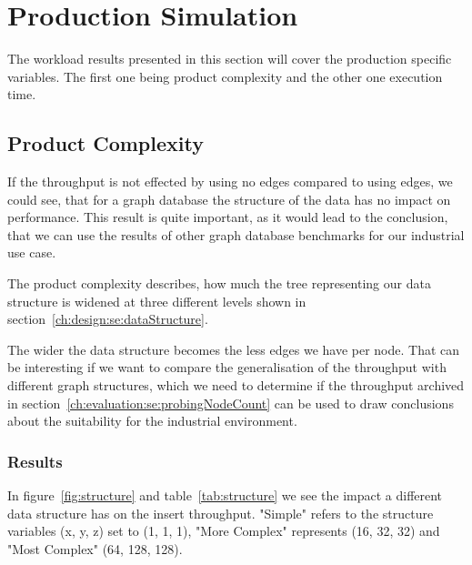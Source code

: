 \section{Production Simulation}
\label{ch:evaluation:se:productionSimulation}
The workload results presented in this section will cover the production specific variables.
The first one being product complexity and the other one execution time.

\subsection{Product Complexity}
\label{ch:evaluation:se:productComplexity}
If the throughput is not effected by using no edges compared to using edges,
we could see,
that for a graph database the structure of the data has no impact on performance.
This result is quite important,
as it would lead to the conclusion,
that we can use the results of other graph database benchmarks for our industrial use case.

The product complexity describes,
how much the tree representing our data structure is widened at three different levels shown in section~\ref{ch:design:se:dataStructure}.

The wider the data structure becomes the less edges we have per node.
That can be interesting if we want to compare the generalisation of the throughput with different graph structures,
which we need to determine if the throughput archived in section~\ref{ch:evaluation:se:probingNodeCount} can be used to draw conclusions about the suitability for the industrial environment.

\subsubsection{Results}
In figure~\ref{fig:structure} and table~\ref{tab:structure} we see the impact a different data structure has on the insert throughput.
"Simple" refers to the structure variables (x, y, z) set to (1, 1, 1),
"More Complex" represents (16, 32, 32) and "Most Complex" (64, 128, 128).

